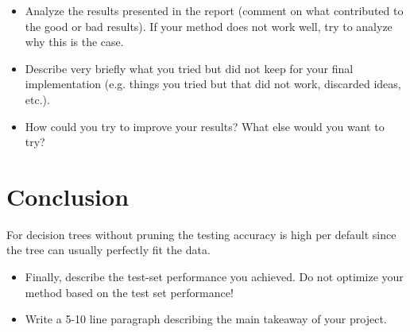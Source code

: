 \documentclass[a4paper, 10pt, conference]{ieeeconf}      %
\begin{document}
{\color{blue}
\begin{itemize}
	\item Analyze the results presented in the report (comment on what contributed to the good or bad results). If your method does not work well, try to analyze why this is the case.
	\item Describe very briefly what you tried but did not keep for your final implementation (e.g. things you tried but that did not work, discarded ideas, etc.).
	\item How could you try to improve your results? What else would you want to try?

\end{itemize}
}

\section{Conclusion}
\label{sec:con}

For decision trees without pruning the testing accuracy is high per default since the tree can usually perfectly fit the data. 

{\color{blue}

  \begin{itemize}
  \item Finally, describe the test-set performance you achieved. Do not
    optimize your method based on the test set performance!
  \item Write a 5-10 line paragraph describing the main takeaway of your project.
  \end{itemize}

}

\end{document}
